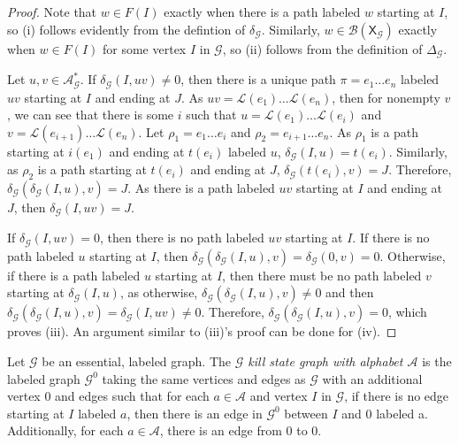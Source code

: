 \documentclass[hidelinks]{article}
\newcommand{\Ac}{\mathcal{A}}  %
\newcommand{\Lc}{\mathcal{L}}  %
\newcommand{\Gc}{\mathcal{G}}  %
\newcommand{\Bc}{\mathcal{B}}
\newcommand{\shift}[1]{\mathsf{X}_{#1}}
\newcommand{\term}[1]{\textit{#1}}
\theoremstyle{definition}
\begin{document}
\begin{proof}
    Note that \(w \in F(I)\) exactly when there is a path labeled \(w\) starting at \(I\), so (i) follows 
    evidently from the defintion of \(\delta_\Gc\). Similarly, \(w \in \Bc(\shift{\Gc})\) exactly 
    when \(w \in F(I)\) for some vertex \(I\) in \(\Gc\), so (ii) follows from the definition of \(\Delta_\Gc\).

    Let \(u, v \in \Ac_\Gc^*\). If \(\delta_\Gc(I, uv) \neq 0\), then there is a unique path \(\pi=e_1 \dots e_n\) 
    labeled \(uv\) starting at \(I\) and ending at \(J\). As \(uv = \Lc(e_1) \dots \Lc(e_n)\), then for 
    nonempty \(v\), we can see that
    there is some \(i\) such that \(u = \Lc(e_1) \dots \Lc(e_i)\) and 
    \(v = \Lc(e_{i+1}) \dots \Lc(e_n)\). Let \(\rho_1 = e_1 \dots e_i\) and \(\rho_2 = e_{i+1} \dots e_n\).
    As \(\rho_1\) is a path starting at \(i(e_1)\) and ending at \(t(e_i)\) labeled \(u\),
    \(\delta_\Gc(I, u) = t(e_i)\). Similarly, as \(\rho_2\) is a path starting 
    at \(t(e_i)\) and ending at \(J\), \(\delta_\Gc(t(e_i), v) = J\). Therefore, 
    \(\delta_\Gc(\delta_\Gc(I, u), v) = J\). As there is a path labeled \(uv\)
    starting at \(I\) and ending at \(J\), then \(\delta_\Gc(I, uv) = J\). 
    
    If \(\delta_\Gc(I, uv) = 0\), 
    then there is no path labeled \(uv\) starting at \(I\). If there is no path 
    labeled \(u\) starting at \(I\), then \(\delta_\Gc(\delta_\Gc(I, u), v) = \delta_\Gc(0, v) = 0\).
    Otherwise, if there is a path labeled \(u\) starting at \(I\), then there must 
    be no path labeled \(v\) starting at \(\delta_\Gc(I, u)\), as otherwise, 
    \(\delta_\Gc(\delta_\Gc(I, u), v) \neq 0\) and then 
    \(\delta_\Gc(\delta_\Gc(I, u), v) = \delta_\Gc(I, uv) \neq 0\). Therefore, \(\delta_\Gc(\delta_\Gc(I, u), v) = 0\),
    which proves (iii). An argument similar to (iii)'s proof can be done for (iv).
\end{proof}

\begin{definition}
    Let \(\Gc\) be an essential, labeled graph. The \term{\(\Gc\) kill state graph with alphabet \(\Ac\)}
    is the labeled graph \(\Gc^0\) taking the same vertices and edges as \(\Gc\) with 
    an additional vertex \(0\) and edges such that for each \(a \in \Ac\) and vertex \(I\) in \(\Gc\),
    if there is no edge starting at \(I\) labeled \(a\), then there is an edge in \(\Gc^0\) 
    between \(I\) and \(0\) labeled a. Additionally, for each \(a \in \Ac\), there is an 
    edge from \(0\) to \(0\).
\end{definition}
\end{document}
